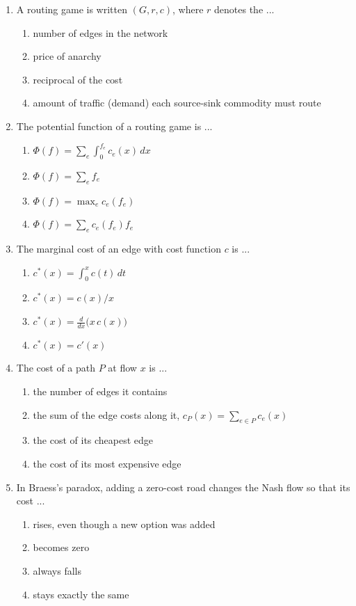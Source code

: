 \documentclass[11pt]{article}
\begin{document}
\begin{enumerate}[itemsep=6pt]
\begin{enumerate}
    \item it sets all costs to zero
    \item it forbids the use of congested edges
    \item it removes all congestion
    \item it makes each driver internalise the congestion they cause
  \end{enumerate}
  \item A routing game is written \(( G, r, c)\), where \(r\) denotes the ...
  \begin{enumerate}
    \item number of edges in the network
    \item price of anarchy
    \item reciprocal of the cost
    \item amount of traffic (demand) each source-sink commodity must route
  \end{enumerate}
  \item The potential function of a routing game is ...
  \begin{enumerate}
    \item \(\Phi(f) = \sum_{e} \int_0^{f_e} c_e(x)\,dx\)
    \item \(\Phi(f) = \sum_e f_e\)
    \item \(\Phi(f) = \max_e c_e(f_e)\)
    \item \(\Phi(f) = \sum_{e} c_e(f_e) f_e\)
  \end{enumerate}
  \item The marginal cost of an edge with cost function \(c\) is ...
  \begin{enumerate}
    \item \(c^*(x) = \int_0^x c(t)\,dt\)
    \item \(c^*(x) = c(x)/x\)
    \item \(c^*(x) = \frac{d}{dx}\big(x\,c(x)\big)\)
    \item \(c^*(x) = c'(x)\)
  \end{enumerate}
  \item The cost of a path \(P\) at flow \(x\) is ...
  \begin{enumerate}
    \item the number of edges it contains
    \item the sum of the edge costs along it, \(c_P(x) = \sum_{e \in P} c_e(x)\)
    \item the cost of its cheapest edge
    \item the cost of its most expensive edge
  \end{enumerate}
  \item In Braess's paradox, adding a zero-cost road changes the Nash flow so that its cost ...
  \begin{enumerate}
    \item rises, even though a new option was added
    \item becomes zero
    \item always falls
    \item stays exactly the same
  \end{enumerate}
\end{enumerate}
\end{document}
